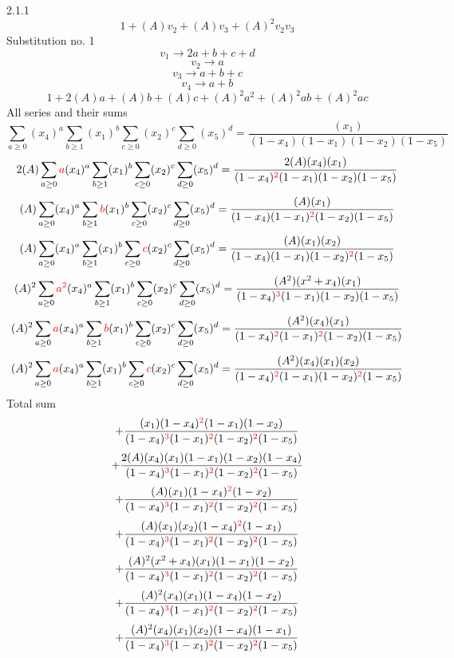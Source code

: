 \documentclass{article}
\begin{document}
                
2.1.1
\[1+(A)v_2+(A)v_3+(A)^2v_2v_3\]Substitution no. 1\[v_1\rightarrow{2a+b+c+d}\]\[v_2\rightarrow{a}\]\[v_3\rightarrow{a+b+c}\]\[v_4\rightarrow{a+b}\]\[1+2(A)a+(A)b+(A)c+(A)^2a^{2}+(A)^2ab+(A)^2ac\]All series and their sums\[\sum_{a\geq{0}}(x_4)^{a}\sum_{b\geq{1}}(x_1)^{b}\sum_{c\geq{0}}(x_2)^{c}\sum_{d\geq{0}}(x_5)^{d}=\frac{(x_1)}{(1-x_4)(1-x_1)(1-x_2)(1-x_5)}\]\[2(A)\sum_{a\geq{0}}\textcolor{red}{a}(x_4)^{a}\sum_{b\geq{1}}(x_1)^{b}\sum_{c\geq{0}}(x_2)^{c}\sum_{d\geq{0}}(x_5)^{d}=\frac{2(A)(x_4)(x_1)}{(1-x_4)^{\textcolor{red}{2}}(1-x_1)(1-x_2)(1-x_5)}\]\[(A)\sum_{a\geq{0}}(x_4)^{a}\sum_{b\geq{1}}\textcolor{red}{b}(x_1)^{b}\sum_{c\geq{0}}(x_2)^{c}\sum_{d\geq{0}}(x_5)^{d}=\frac{(A)(x_1)}{(1-x_4)(1-x_1)^{\textcolor{red}{2}}(1-x_2)(1-x_5)}\]\[(A)\sum_{a\geq{0}}(x_4)^{a}\sum_{b\geq{1}}(x_1)^{b}\sum_{c\geq{0}}\textcolor{red}{c}(x_2)^{c}\sum_{d\geq{0}}(x_5)^{d}=\frac{(A)(x_1)(x_2)}{(1-x_4)(1-x_1)(1-x_2)^{\textcolor{red}{2}}(1-x_5)}\]\[(A)^{2}\sum_{a\geq{0}}\textcolor{red}{a^{2}}(x_4)^{a}\sum_{b\geq{1}}(x_1)^{b}\sum_{c\geq{0}}(x_2)^{c}\sum_{d\geq{0}}(x_5)^{d}=\frac{(A^{2})(x^{2}+x_4)(x_1)}{(1-x_4)^{\textcolor{red}{3}}(1-x_1)(1-x_2)(1-x_5)}\]\[(A)^{2}\sum_{a\geq{0}}\textcolor{red}{a}(x_4)^{a}\sum_{b\geq{1}}\textcolor{red}{b}(x_1)^{b}\sum_{c\geq{0}}(x_2)^{c}\sum_{d\geq{0}}(x_5)^{d}=\frac{(A^{2})(x_4)(x_1)}{(1-x_4)^{\textcolor{red}{2}}(1-x_1)^{\textcolor{red}{2}}(1-x_2)(1-x_5)}\]\[(A)^{2}\sum_{a\geq{0}}\textcolor{red}{a}(x_4)^{a}\sum_{b\geq{1}}(x_1)^{b}\sum_{c\geq{0}}\textcolor{red}{c}(x_2)^{c}\sum_{d\geq{0}}(x_5)^{d}=\frac{(A^{2})(x_4)(x_1)(x_2)}{(1-x_4)^{\textcolor{red}{2}}(1-x_1)(1-x_2)^{\textcolor{red}{2}}(1-x_5)}\]
Total sum
\[+\frac{(x_1)(1-x_4)^{\textcolor{red}{2}}(1-x_1)(1-x_2)}{(1-x_4)^{\textcolor{red}{3}}(1-x_1)^{\textcolor{red}{2}}(1-x_2)^{\textcolor{red}{2}}(1-x_5)}\]\[+\frac{2(A)(x_4)(x_1)(1-x_1)(1-x_2)(1-x_4)}{(1-x_4)^{\textcolor{red}{3}}(1-x_1)^{\textcolor{red}{2}}(1-x_2)^{\textcolor{red}{2}}(1-x_5)}\]\[+\frac{(A)(x_1)(1-x_4)^{\textcolor{red}{2}}(1-x_2)}{(1-x_4)^{\textcolor{red}{3}}(1-x_1)^{\textcolor{red}{2}}(1-x_2)^{\textcolor{red}{2}}(1-x_5)}\]\[+\frac{(A)(x_1)(x_2)(1-x_4)^{\textcolor{red}{2}}(1-x_1)}{(1-x_4)^{\textcolor{red}{3}}(1-x_1)^{\textcolor{red}{2}}(1-x_2)^{\textcolor{red}{2}}(1-x_5)}\]\[+\frac{(A)^{2}(x^{2}+x_4)(x_1)(1-x_1)(1-x_2)}{(1-x_4)^{\textcolor{red}{3}}(1-x_1)^{\textcolor{red}{2}}(1-x_2)^{\textcolor{red}{2}}(1-x_5)}\]\[+\frac{(A)^{2}(x_4)(x_1)(1-x_4)(1-x_2)}{(1-x_4)^{\textcolor{red}{3}}(1-x_1)^{\textcolor{red}{2}}(1-x_2)^{\textcolor{red}{2}}(1-x_5)}\]\[+\frac{(A)^{2}(x_4)(x_1)(x_2)(1-x_4)(1-x_1)}{(1-x_4)^{\textcolor{red}{3}}(1-x_1)^{\textcolor{red}{2}}(1-x_2)^{\textcolor{red}{2}}(1-x_5)}\]
\end{document}
